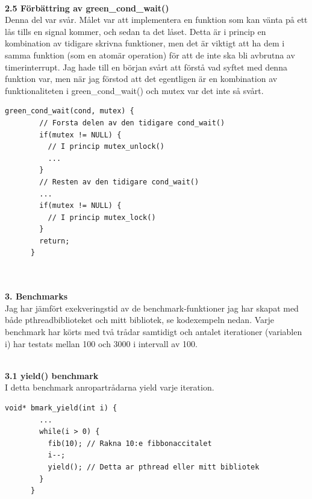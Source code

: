 \documentclass[a4paper,10pt]{article}
\begin{document}

\maketitle
\textbf
    {\\  2.5 Förbättring av green\_cond\_wait()\\}
    Denna del var svår. Målet var att implementera en funktion som kan vänta på ett lås tills en signal kommer, och sedan ta det låset. Detta är i princip en kombination av tidigare skrivna funktioner, men det är viktigt att ha dem i samma funktion (som en atomär operation) för att de inte ska bli avbrutna av timerinterrupt. Jag hade till en början svårt att förstå vad syftet med denna funktion var, men när jag förstod att det egentligen är en kombination av funktionaliteten i green\_cond\_wait() och mutex var det inte så svårt.
    
    \begin{lstlisting}[style=CStyle]
      green_cond_wait(cond, mutex) {
        // Forsta delen av den tidigare cond_wait()
        if(mutex != NULL) {
          // I princip mutex_unlock()
          ...
        }
        // Resten av den tidigare cond_wait()
        ...
        if(mutex != NULL) {
          // I princip mutex_lock()
        }
        return;
      }
    \end{lstlisting}
  
    
    \maketitle
    \textbf
{\\\\3. Benchmarks\\}
Jag har jämfört exekveringstid av de benchmark-funktioner jag har skapat med både pthreadbiblioteket och mitt bibliotek, se kodexempeln nedan. Varje benchmark har körts med två trådar samtidigt och antalet iterationer (variablen i) har testats mellan 100 och 3000 i intervall av 100.
\maketitle
\textbf
    {\\3.1 yield() benchmark\\}
    I detta benchmark anropartrådarna yield varje iteration.
    \begin{lstlisting}[style=CStyle]
      void* bmark_yield(int i) {
        ...
        while(i > 0) {
          fib(10); // Rakna 10:e fibbonaccitalet
          i--;
          yield(); // Detta ar pthread eller mitt bibliotek
        }
      }
    \end{lstlisting}
    
\end{document}
